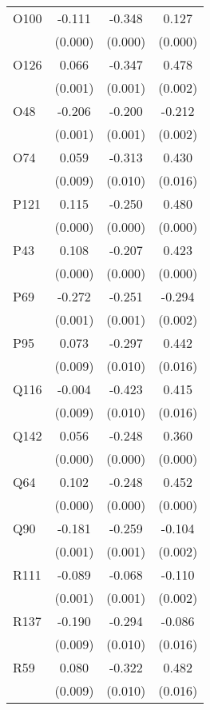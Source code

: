 \begin{table}[htbp]
\begin{tabular}{l*{3}{c}}
O100            &   -0.111&   -0.348&    0.127\\
                &  (0.000)&  (0.000)&  (0.000)\\
O126            &    0.066&   -0.347&    0.478\\
                &  (0.001)&  (0.001)&  (0.002)\\
O48             &   -0.206&   -0.200&   -0.212\\
                &  (0.001)&  (0.001)&  (0.002)\\
O74             &    0.059&   -0.313&    0.430\\
                &  (0.009)&  (0.010)&  (0.016)\\
P121            &    0.115&   -0.250&    0.480\\
                &  (0.000)&  (0.000)&  (0.000)\\
P43             &    0.108&   -0.207&    0.423\\
                &  (0.000)&  (0.000)&  (0.000)\\
P69             &   -0.272&   -0.251&   -0.294\\
                &  (0.001)&  (0.001)&  (0.002)\\
P95             &    0.073&   -0.297&    0.442\\
                &  (0.009)&  (0.010)&  (0.016)\\
Q116            &   -0.004&   -0.423&    0.415\\
                &  (0.009)&  (0.010)&  (0.016)\\
Q142            &    0.056&   -0.248&    0.360\\
                &  (0.000)&  (0.000)&  (0.000)\\
Q64             &    0.102&   -0.248&    0.452\\
                &  (0.000)&  (0.000)&  (0.000)\\
Q90             &   -0.181&   -0.259&   -0.104\\
                &  (0.001)&  (0.001)&  (0.002)\\
R111            &   -0.089&   -0.068&   -0.110\\
                &  (0.001)&  (0.001)&  (0.002)\\
R137            &   -0.190&   -0.294&   -0.086\\
                &  (0.009)&  (0.010)&  (0.016)\\
R59             &    0.080&   -0.322&    0.482\\
                &  (0.009)&  (0.010)&  (0.016)\\

\end{tabular}
\end{table}
